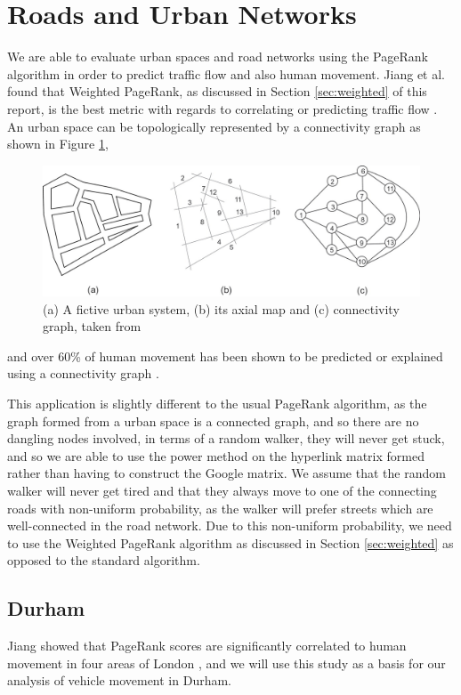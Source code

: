 \documentclass[11pt]{report}
\begin{document}
\section{Roads and Urban Networks} \label{sec:Roads}
We are able to evaluate urban spaces and road networks using the PageRank algorithm in order to predict traffic flow and also human movement. Jiang et al. found that Weighted PageRank, as discussed in Section \ref{sec:weighted} of this report, is the best metric with regards to correlating or predicting traffic flow \cite{1742-5468-2008-07-P07008}. An urban space can be topologically represented by a connectivity graph as shown in Figure \ref{fig:city rep},
\begin{figure}[h]
\centering
\includegraphics[width=\linewidth]{map_view.jpeg}
\caption{(a) A fictive urban system, (b) its axial map and (c) connectivity graph, taken from \cite{doi:10.1080/13658810802022822}}
\label{fig:city rep}
\end{figure}
and over 60\% of human movement has been shown to be predicted or explained using a connectivity graph \cite{doi:10.1080/13658810802022822}.



This application is slightly different to the usual PageRank algorithm, as the graph formed from a urban space is a connected graph, and so there are no dangling nodes involved, in terms of a random walker, they will never get stuck, and so we are able to use the power method on the hyperlink matrix formed rather than having to construct the Google matrix. We assume that the random walker will never get tired and that they always move to one of the connecting roads with non-uniform probability, as the walker will prefer streets which are well-connected in the road network. Due to this non-uniform probability, we need to use the Weighted PageRank algorithm as discussed in Section \ref{sec:weighted} as opposed to the standard algorithm.
\FloatBarrier
\subsection{Durham} \label{sec:durham}
Jiang showed that PageRank scores are significantly correlated to human movement in four areas of London \cite{doi:10.1080/13658810802022822}, and we will use this study as a basis for our analysis of vehicle movement in Durham. 
\end{document}
